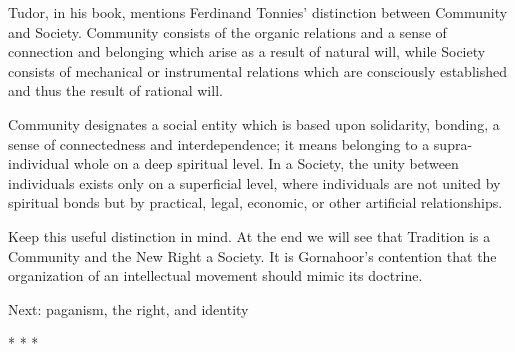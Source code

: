 Tudor, in his book, mentions Ferdinand Tonnies' distinction between Community and Society. Community consists of the organic relations and a sense of connection and belonging which arise as a result of natural will, while Society consists of mechanical or instrumental relations which are consciously established and thus the result of rational will.

Community designates a social entity which is based upon solidarity, bonding, a sense of connectedness and interdependence; it means belonging to a supra-individual whole on a deep spiritual level. In a Society, the unity between individuals exists only on a superficial level, where individuals are not united by spiritual bonds but by practical, legal, economic, or other artificial relationships.

Keep this useful distinction in mind. At the end we will see that Tradition is a Community and the New Right a Society. It is Gornahoor's contention that the organization of an intellectual movement should mimic its doctrine.

{Next: paganism, the right, and identity}



\begin{center}* * *\end{center}

